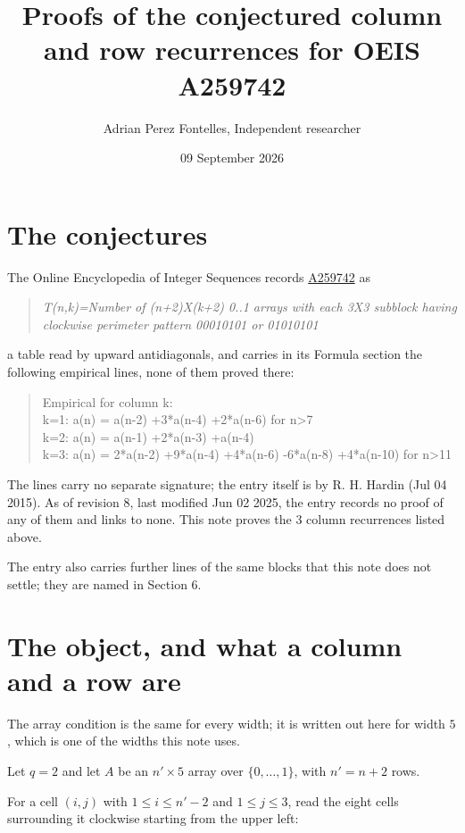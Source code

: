 \documentclass[11pt]{article}
\title{Proofs of the conjectured column and row recurrences for OEIS A259742}
\author{Adrian Perez Fontelles, Independent researcher}
\date{09 September 2026}
\theoremstyle{definition}
\begin{document}
\maketitle
\section{The conjectures}

The Online Encyclopedia of Integer Sequences records \href{https://oeis.org/A259742}{A259742} as

\begin{quote}\itshape T(n,k)=Number of (n+2)X(k+2) 0..1 arrays with each 3X3 subblock having clockwise perimeter pattern 00010101 or 01010101\end{quote}

a table read by upward antidiagonals, and carries in its Formula section the following empirical lines, none of them proved there:

\begin{quote}\ttfamily Empirical for column k:\\
k=1: a(n) = a(n-2) +3*a(n-4) +2*a(n-6) for n>7\\k=2: a(n) = a(n-1) +2*a(n-3) +a(n-4)\\k=3: a(n) = 2*a(n-2) +9*a(n-4) +4*a(n-6) -6*a(n-8) +4*a(n-10) for n>11\end{quote}

The lines carry no separate signature; the entry itself is by R. H. Hardin (Jul 04 2015). As of revision 8, last modified Jun 02 2025, the entry records no proof of any of them and links to none. This note proves the 3 column recurrences listed above.

The entry also carries further lines of the same blocks that this note does not settle; they are named in Section 6.

\section{The object, and what a column and a row are}

The array condition is the same for every width; it is written out here for width $5$, which is one of the widths this note uses.

Let $q = 2$ and let $A$ be an $n' \times 5$ array over $\{0,\dots,1\}$, with $n' = n + 2$ rows.

For a cell $(i,j)$ with $1 \le i \le n'-2$ and $1 \le j \le 3$, read the eight cells surrounding it clockwise starting from the upper left:
\end{document}
